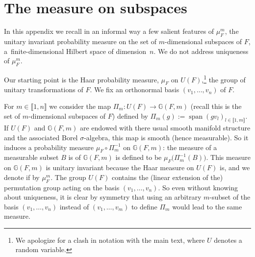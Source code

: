 \documentclass[pdftex]{sigma}%
\DeclareMathOperator{\psan}{span}
\newcommand{\intt}[1]{\llbracket #1 \rrbracket}
\newcommand{\salg}{$\sigma$-algebra}
\newcommand{\rv}{random variable}
\begin{document}
\appendix

\section{The measure on subspaces} \label{appsec:messubsp}

In this appendix we recall in an informal way a few salient features of $\mu_F^m$, the unitary invariant probability measure on the set of $m$-dimensional subspaces of $F$, a~finite-dimensional Hilbert space of dimension~$n$. We do not address uniqueness of $\mu_F^m$.

Our starting point is the Haar probability measure, $\mu_F$ on $U(F)$,\footnote{We apologize for a clash in notation with the main text, where $U$ denotes a \rv.} the group of unitary transformations of $F$. We fix an orthonormal basis $(v_1,\dots,v_n)$ of $F$.

For $m\in \intt{1,n}$ we consider the map $\Pi_m\colon U(F) \to \mathbb{G}(F,m)$ (recall this is the set of $m$-dimensional subspaces of $F$) defined by $\Pi_m(g):=\psan (gv_l)_{l\in \intt{1,m}}$. If $U(F)$ and $\mathbb{G}(F,m)$ are endowed with there usual smooth manifold structure and the associated Borel \salg , this map is smooth (hence measurable). So it induces a probability measure $\mu_F \circ \Pi_m^{-1}$ on $\mathbb{G}(F,m)$: the measure of a measurable subset $B$ is of $\mathbb{G}(F,m)$ is defined to be $\mu_F \big(\Pi_m^{-1}(B)\big)$. This measure on $\mathbb{G}(F,m)$ is unitary invariant because the Haar measure on $U(F)$ is, and we denote if by $\mu_F^m$. The group $U(F)$ contains the (linear extension of the) permutation group acting on the basis $(v_1,\dots,v_n)$. So even without knowing about uniqueness, it is clear by symmetry that using an arbitrary $m$-subset of the basis $(v_1,\dots,v_n)$ instead of $(v_1,\dots,v_m)$ to define $\Pi_m$ would lead to the same measure.
\end{document}
